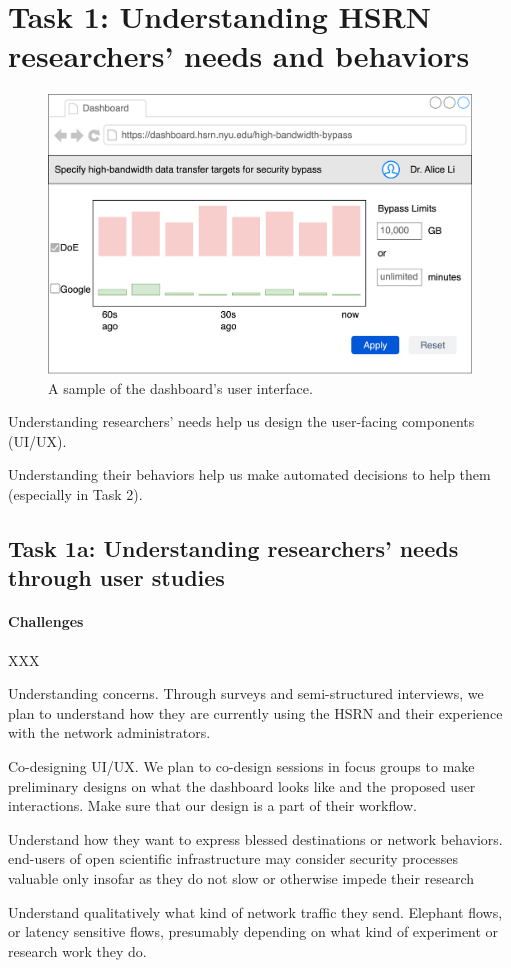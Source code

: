 \section{Task 1: Understanding HSRN researchers' needs and behaviors}

\begin{figure}[t]
    \centering
    \includegraphics[width=0.5\linewidth]{figures/dashboard.png}
    \caption{A sample of the dashboard's user interface.}
    \label{fig:dashboard}
\end{figure}


Understanding researchers' needs help us design the user-facing components (UI/UX).

Understanding their behaviors help us make automated decisions to help them (especially in Task 2).

\subsection{Task 1a: Understanding researchers' needs through user studies}

\paragraph{Challenges} XXX

Understanding concerns. Through surveys and semi-structured interviews, we plan to understand how they are currently using the HSRN and their experience with the network administrators.

Co-designing UI/UX. We plan to co-design sessions in focus groups to make preliminary designs on what the dashboard looks like and the proposed user interactions. Make sure that our design is a part of their workflow.

Understand how they want to express blessed destinations or network behaviors. end-users of open scientific infrastructure may consider security processes valuable only insofar as they do not slow or otherwise impede their research

Understand qualitatively what kind of network traffic they send. Elephant flows, or latency sensitive flows, presumably depending on what kind of experiment or research work they do.

